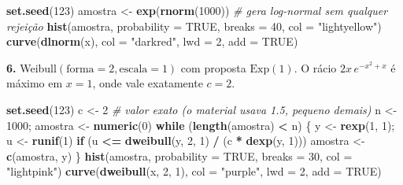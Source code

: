 \documentclass[
  portuguese,
  11pt,
  openany]{book}
\newenvironment{Shaded}{\begin{snugshade}}{\end{snugshade}}
\newcommand{\AttributeTok}[1]{\textcolor[rgb]{0.13,0.29,0.53}{#1}}
\newcommand{\CommentTok}[1]{\textcolor[rgb]{0.56,0.35,0.01}{\textit{#1}}}
\newcommand{\ConstantTok}[1]{\textcolor[rgb]{0.56,0.35,0.01}{#1}}
\newcommand{\ControlFlowTok}[1]{\textcolor[rgb]{0.13,0.29,0.53}{\textbf{#1}}}
\newcommand{\DecValTok}[1]{\textcolor[rgb]{0.00,0.00,0.81}{#1}}
\newcommand{\FunctionTok}[1]{\textcolor[rgb]{0.13,0.29,0.53}{\textbf{#1}}}
\newcommand{\NormalTok}[1]{#1}
\newcommand{\OtherTok}[1]{\textcolor[rgb]{0.56,0.35,0.01}{#1}}
\newcommand{\SpecialCharTok}[1]{\textcolor[rgb]{0.81,0.36,0.00}{\textbf{#1}}}
\newcommand{\StringTok}[1]{\textcolor[rgb]{0.31,0.60,0.02}{#1}}
\begin{document}
\begin{Shaded}
\begin{Highlighting}[]
\FunctionTok{set.seed}\NormalTok{(}\DecValTok{123}\NormalTok{)}
\NormalTok{amostra }\OtherTok{\textless{}{-}} \FunctionTok{exp}\NormalTok{(}\FunctionTok{rnorm}\NormalTok{(}\DecValTok{1000}\NormalTok{))        }\CommentTok{\# gera log{-}normal sem qualquer rejeição}
\FunctionTok{hist}\NormalTok{(amostra, }\AttributeTok{probability =} \ConstantTok{TRUE}\NormalTok{, }\AttributeTok{breaks =} \DecValTok{40}\NormalTok{, }\AttributeTok{col =} \StringTok{"lightyellow"}\NormalTok{)}
\FunctionTok{curve}\NormalTok{(}\FunctionTok{dlnorm}\NormalTok{(x), }\AttributeTok{col =} \StringTok{"darkred"}\NormalTok{, }\AttributeTok{lwd =} \DecValTok{2}\NormalTok{, }\AttributeTok{add =} \ConstantTok{TRUE}\NormalTok{)}
\end{Highlighting}
\end{Shaded}

\textbf{6.} Weibull\((\text{forma}=2, \text{escala}=1)\) com proposta \(\text{Exp}(1)\). O
rácio \(2x\,e^{-x^2 + x}\) é máximo em \(x = 1\), onde vale exatamente \(c = 2\).

\begin{Shaded}
\begin{Highlighting}[]
\FunctionTok{set.seed}\NormalTok{(}\DecValTok{123}\NormalTok{)}
\NormalTok{c }\OtherTok{\textless{}{-}} \DecValTok{2}                             \CommentTok{\# valor exato (o material usava 1.5, pequeno demais)}
\NormalTok{n }\OtherTok{\textless{}{-}} \DecValTok{1000}\NormalTok{; amostra }\OtherTok{\textless{}{-}} \FunctionTok{numeric}\NormalTok{(}\DecValTok{0}\NormalTok{)}
\ControlFlowTok{while}\NormalTok{ (}\FunctionTok{length}\NormalTok{(amostra) }\SpecialCharTok{\textless{}}\NormalTok{ n) \{}
\NormalTok{  y }\OtherTok{\textless{}{-}} \FunctionTok{rexp}\NormalTok{(}\DecValTok{1}\NormalTok{, }\DecValTok{1}\NormalTok{); u }\OtherTok{\textless{}{-}} \FunctionTok{runif}\NormalTok{(}\DecValTok{1}\NormalTok{)}
  \ControlFlowTok{if}\NormalTok{ (u }\SpecialCharTok{\textless{}=} \FunctionTok{dweibull}\NormalTok{(y, }\DecValTok{2}\NormalTok{, }\DecValTok{1}\NormalTok{) }\SpecialCharTok{/}\NormalTok{ (c }\SpecialCharTok{*} \FunctionTok{dexp}\NormalTok{(y, }\DecValTok{1}\NormalTok{))) amostra }\OtherTok{\textless{}{-}} \FunctionTok{c}\NormalTok{(amostra, y)}
\NormalTok{\}}
\FunctionTok{hist}\NormalTok{(amostra, }\AttributeTok{probability =} \ConstantTok{TRUE}\NormalTok{, }\AttributeTok{breaks =} \DecValTok{30}\NormalTok{, }\AttributeTok{col =} \StringTok{"lightpink"}\NormalTok{)}
\FunctionTok{curve}\NormalTok{(}\FunctionTok{dweibull}\NormalTok{(x, }\DecValTok{2}\NormalTok{, }\DecValTok{1}\NormalTok{), }\AttributeTok{col =} \StringTok{"purple"}\NormalTok{, }\AttributeTok{lwd =} \DecValTok{2}\NormalTok{, }\AttributeTok{add =} \ConstantTok{TRUE}\NormalTok{)}
\end{Highlighting}
\end{Shaded}
\end{document}
